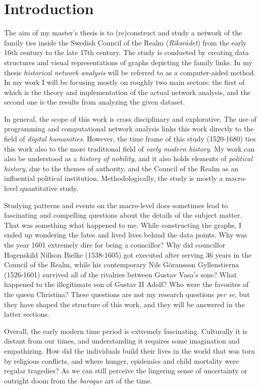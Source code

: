 \section{Introduction}
The aim of my master's thesis is to (re)construct and study a network of the family ties inside the Swedish Council of the Realm (\textit{Riksrådet}) from the early 16th century to the late 17th century. The study is conducted by creating data structures and visual representations of graphs depicting the family links. In my thesis \textit{historical network analysis} will be referred to as a computer-aided method. In my work I will be focusing mostly on roughly two main sectors: the first of which is the theory and implementation of the actual network analysis, and the second one is the results from analyzing the given dataset.

In general, the scope of this work is cross disciplinary and explorative. The use of programming and computational network analysis links this work directly to the field of \textit{digital humanities}. However, the time frame of this study (1520-1680) ties this work also to the more traditional field of \textit{early modern history}. My work can also be understood as a \textit{history of nobility}, and it also holds elements of \textit{political history}, due to the themes of authority, and the Council of the Realm as an influential political institution. Methodologically, the study is mostly a macro-level quantitative study. 

Studying patterns and events on the macro-level does sometimes lead to fascinating and compelling questions about the details of the subject matter. That was something what happened to me. While constructing the graphs, I ended up wondering the fates and lived lives behind the data points. Why was the year 1601 extremely dire for being a councillor? Why did councillor Hogenskild Nillson Bielke (1538-1605) got executed after serving 36 years in the Council of the Realm, while his contemporary Nils Göransson Gyllenstierna (1526-1601) survived all of the rivalries between Gustav Vasa's sons? What happened to the illegitimate son of Gustav II Adolf? Who were the favorites of the  queen Christina? These questions are not my research questions \textit{per se}, but they have shaped the structure of this work, and they will be answered in the latter sections.   

Overall, the early modern time period is extremely fascinating. Culturally it is distant from our times, and understanding it requires some imagination and empathizing. How did the individuals build their lives in the world that was torn by religious conflicts, and where hunger, epidemics and child mortality were regular tragedies? As we can still perceive the lingering sense of uncertainty or outright doom from the \textit{baroque} art of the time.  

